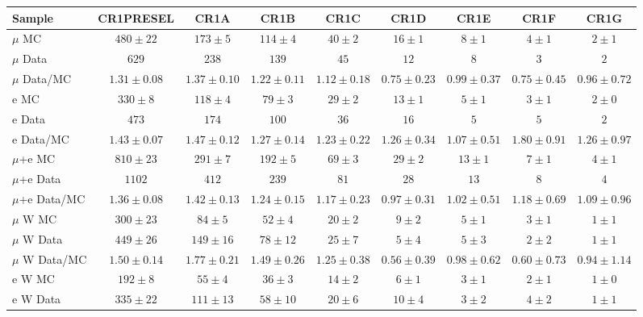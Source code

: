 \begin{table}[!h]
\begin{center}
{\footnotesize
\begin{tabular}{l||c||c|c|c|c|c|c|c}
\hline
Sample              & CR1PRESEL & CR1A & CR1B & CR1C & CR1D & CR1E &
CR1F & CR1G\\
\hline
\hline
$\mu$ MC 		  & $480 \pm 22$ & $173 \pm 5$ & $114 \pm 4$ & $40 \pm 2$ & $16 \pm 1$ & $8 \pm 1$ & $4 \pm 1$ & $2 \pm 1$ \\
$\mu$ Data 		  & $629$ & $238$ & $139$ & $45$ & $12$ & $8$ & $3$ & $2$ \\
\hline
$\mu$ Data/MC 	  & $1.31 \pm 0.08$ & $1.37 \pm 0.10$ & $1.22 \pm 0.11$ & $1.12 \pm 0.18$ & $0.75 \pm 0.23$ & $0.99 \pm 0.37$ & $0.75 \pm 0.45$ & $0.96 \pm 0.72$ \\
\hline
\hline
e MC 		  & $330 \pm 8$ & $118 \pm 4$ & $79 \pm 3$ & $29 \pm 2$ & $13 \pm 1$ & $5 \pm 1$ & $3 \pm 1$ & $2 \pm 0$ \\
e Data 		  & $473$ & $174$ & $100$ & $36$ & $16$ & $5$ & $5$ & $2$ \\
\hline
e Data/MC 	  & $1.43 \pm 0.07$ & $1.47 \pm 0.12$ & $1.27 \pm 0.14$ & $1.23 \pm 0.22$ & $1.26 \pm 0.34$ & $1.07 \pm 0.51$ & $1.80 \pm 0.91$ & $1.26 \pm 0.97$ \\
\hline
\hline
$\mu$+e MC 		  & $810 \pm 23$ & $291 \pm 7$ & $192 \pm 5$ & $69 \pm 3$ & $29 \pm 2$ & $13 \pm 1$ & $7 \pm 1$ & $4 \pm 1$ \\
$\mu$+e Data 		  & $1102$ & $412$ & $239$ & $81$ & $28$ & $13$ & $8$ & $4$ \\
\hline
$\mu$+e Data/MC 	  & $1.36 \pm 0.08$ & $1.42 \pm 0.13$ & $1.24 \pm 0.15$ & $1.17 \pm 0.23$ & $0.97 \pm 0.31$ & $1.02 \pm 0.51$ & $1.18 \pm 0.69$ & $1.09 \pm 0.96$ \\
\hline
\hline
\hline
$\mu$ W MC 		  & $300 \pm 23$ & $84 \pm 5$ & $52 \pm 4$ & $20 \pm 2$ & $9 \pm 2$ & $5 \pm 1$ & $3 \pm 1$ & $1 \pm 1$ \\
$\mu$ W Data 	  & $449 \pm 26$ & $149 \pm 16$ & $78 \pm 12$ & $25 \pm 7$ & $5 \pm 4$ & $5 \pm 3$ & $2 \pm 2$ & $1 \pm 1$ \\
\hline
$\mu$ W Data/MC 	  & $1.50 \pm 0.14$ & $1.77 \pm 0.21$ & $1.49 \pm 0.26$ & $1.25 \pm 0.38$ & $0.56 \pm 0.39$ & $0.98 \pm 0.62$ & $0.60 \pm 0.73$ & $0.94 \pm 1.14$ \\
\hline
\hline
e W MC 		  & $192 \pm 8$ & $55 \pm 4$ & $36 \pm 3$ & $14 \pm 2$ & $6 \pm 1$ & $3 \pm 1$ & $2 \pm 1$ & $1 \pm 0$ \\
e W Data 	  & $335 \pm 22$ & $111 \pm 13$ & $58 \pm 10$ & $20 \pm 6$ & $10 \pm 4$ & $3 \pm 2$ & $4 \pm 2$ & $1 \pm 1$ \\

\end{tabular}}
\end{center}
\end{table}
